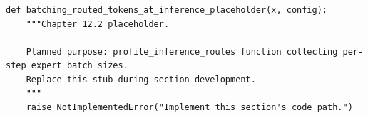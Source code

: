 \begin{lstlisting}[style=bookpython,caption={Planned code placeholder for batching routed tokens at inference.},label={lst:ch12-batching-routed-tokens-at-inference}]
def batching_routed_tokens_at_inference_placeholder(x, config):
    """Chapter 12.2 placeholder.

    Planned purpose: profile_inference_routes function collecting per-step expert batch sizes.
    Replace this stub during section development.
    """
    raise NotImplementedError("Implement this section's code path.")
\end{lstlisting}
